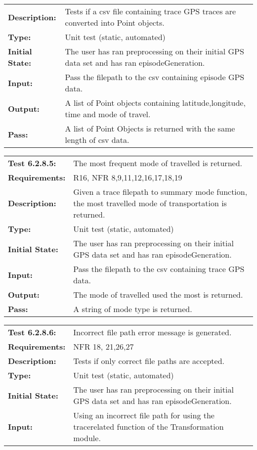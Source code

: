 \documentclass[12pt, titlepage]{article}
\begin{document}
{\begin{tabular}{|l|p{10cm}|}
    \bf{Description}: & Tests if a csv file containing trace GPS traces are converted into Point objects. \\
    \bf{Type}: & Unit test (static, automated) \\
    \bf{Initial State}: & The user has ran preprocessing on their initial GPS data set and has ran episodeGeneration. \\
    \bf{Input}: & Pass the filepath to the csv containing episode GPS data.\\
    \bf{Output}: & A list of Point objects containing latitude,longitude, time and mode of travel.\\
    \bf{Pass}: & A list of Point Objects is returned with the same length of csv data.\\
    \hline
\end{tabular}
\begin{tabular}{|l|p{10cm}|}
    \hline
    \bf{Test} 6.2.8.5: & The most frequent mode of travelled is returned.\\
    \bf{Requirements}: & R16, NFR 8,9,11,12,16,17,18,19 \\
    \bf{Description}: & Given a trace filepath to summary mode function, the most travelled mode of transportation is returned.\\
    \bf{Type}: & Unit test (static, automated) \\
    \bf{Initial State}: & The user has ran preprocessing on their initial GPS data set and has ran episodeGeneration. \\
    \bf{Input}: & Pass the filepath to the csv containing trace GPS data.\\
    \bf{Output}: & The mode of travelled used the most is returned.\\
    \bf{Pass}: & A string of mode type is returned.\\
    \hline
\end{tabular}
\begin{tabular}{|l|p{10cm}|}
    \hline
    \bf{Test} 6.2.8.6: & Incorrect file path error message is generated.\\
    \bf{Requirements}: &  NFR 18, 21,26,27\\
    \bf{Description}: & Tests if only correct file paths are accepted. \\
    \bf{Type}: & Unit test (static, automated) \\
    \bf{Initial State}: & The user has ran preprocessing on their initial GPS data set and has ran episodeGeneration. \\
    \bf{Input}: & Using an incorrect file path for using the tracerelated function of the Transformation module.\\

\end{tabular}}
\end{document}
